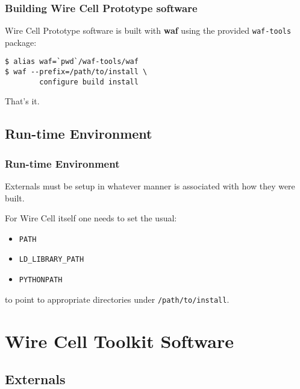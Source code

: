 \documentclass[xcolor=dvipsnames]{beamer}
\begin{document}
\begin{frame}[fragile]
  \frametitle{Building Wire Cell Prototype software}
  
  Wire Cell Prototype software is built with \textbf{waf} using the
  provided \texttt{waf-tools} package:

\begin{verbatim}
$ alias waf=`pwd`/waf-tools/waf
$ waf --prefix=/path/to/install \
        configure build install
\end{verbatim}


\vspace{5mm}
That's it.

\end{frame}

\subsection{Run-time Environment}

\begin{frame}[fragile]
  \frametitle{Run-time Environment}

  Externals must be setup in whatever manner is associated with how they were built.

  For Wire Cell itself one needs to set the usual:

  \begin{itemize}
  \item \verb|PATH|
  \item \verb|LD_LIBRARY_PATH|
  \item \verb|PYTHONPATH|
  \end{itemize}

  to point to appropriate directories under \verb|/path/to/install|.

\end{frame}

\section{Wire Cell Toolkit Software}

\begin{frame}
\end{frame}

\subsection{Externals}
\end{document}
